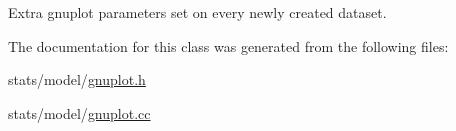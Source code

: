 Extra gnuplot parameters set on every newly created dataset. 



The documentation for this class was generated from the following files\+:\begin{DoxyCompactItemize}
\item 
stats/model/\hyperlink{gnuplot_8h}{gnuplot.\+h}\item 
stats/model/\hyperlink{gnuplot_8cc}{gnuplot.\+cc}\end{DoxyCompactItemize}
